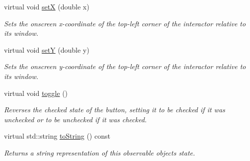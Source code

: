 \begin{DoxyCompactItemize}
virtual void \mbox{\hyperlink{classsgl_1_1GInteractor_a9c18fcc579333bf9653d13ad2b372e39}{setX}} (double x)
\begin{DoxyCompactList}\small\item\em Sets the onscreen x-\/coordinate of the top-\/left corner of the interactor relative to its window. \end{DoxyCompactList}\item 
virtual void \mbox{\hyperlink{classsgl_1_1GInteractor_a7d57e2a5c35d27feb58fd498a3cf82b9}{setY}} (double y)
\begin{DoxyCompactList}\small\item\em Sets the onscreen y-\/coordinate of the top-\/left corner of the interactor relative to its window. \end{DoxyCompactList}\item 
virtual void \mbox{\hyperlink{classsgl_1_1GRadioButton_ad277193b2dca0bab1e0ad24d45407dc3}{toggle}} ()
\begin{DoxyCompactList}\small\item\em Reverses the checked state of the button, setting it to be checked if it was unchecked or to be unchecked if it was checked. \end{DoxyCompactList}\item 
virtual std\+::string \mbox{\hyperlink{classsgl_1_1GObservable_a1fe5121d6528fdea3f243321b3fa3a49}{to\+String}} () const
\begin{DoxyCompactList}\small\item\em Returns a string representation of this observable object\textquotesingle{}s state. \end{DoxyCompactList}\end{DoxyCompactItemize}
